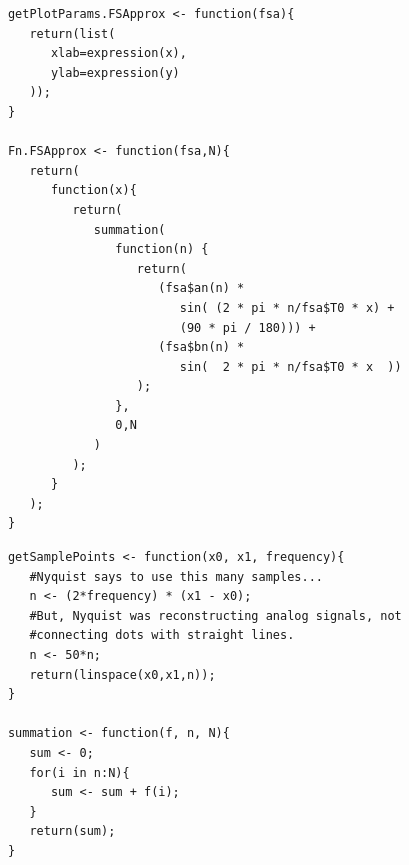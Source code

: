 \documentclass{beamer}
\begin{document}
\begin{frame}[fragile]
   \begin{center}
   \begin{minipage}{100mm}
   \begin{lstlisting}
      getPlotParams.FSApprox <- function(fsa){
         return(list(
            xlab=expression(x),
            ylab=expression(y)
         ));
      }

      Fn.FSApprox <- function(fsa,N){
         return(
            function(x){
               return(
                  summation(
                     function(n) {
                        return(
                           (fsa$an(n) * 
                              sin( (2 * pi * n/fsa$T0 * x) + 
                              (90 * pi / 180))) +
                           (fsa$bn(n) * 
                              sin(  2 * pi * n/fsa$T0 * x  )) 
                        );
                     }, 
                     0,N
                  )
               );
            }
         );
      }
   \end{lstlisting}
   \end{minipage}
   \end{center}
\end{frame}

\begin{frame}[fragile]
   \begin{center}
   \begin{minipage}{100mm}
   \begin{lstlisting}
      getSamplePoints <- function(x0, x1, frequency){
         #Nyquist says to use this many samples...
         n <- (2*frequency) * (x1 - x0);
         #But, Nyquist was reconstructing analog signals, not 
         #connecting dots with straight lines.
         n <- 50*n;
         return(linspace(x0,x1,n));
      }

      summation <- function(f, n, N){
         sum <- 0;
         for(i in n:N){
            sum <- sum + f(i);
         }
         return(sum);
      }
   \end{lstlisting}
   \end{minipage}
   \end{center}
\end{frame}
\end{document}
